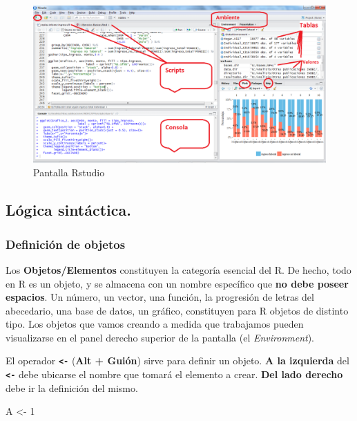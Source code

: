 \documentclass[]{book}
\newenvironment{Shaded}{\begin{snugshade}}{\end{snugshade}}
\newcommand{\DecValTok}[1]{\textcolor[rgb]{0.00,0.00,0.81}{#1}}
\newcommand{\NormalTok}[1]{#1}
\newcommand{\StringTok}[1]{\textcolor[rgb]{0.31,0.60,0.02}{#1}}
\begin{document}
\begin{figure}
\centering
\includegraphics[width=7.8125in,height=\textheight]{img/Pantalla Rstudio.png}
\caption{Pantalla Rstudio}
\end{figure}

\hypertarget{logica-sintactica.}{%
\subsection{Lógica sintáctica.}\label{logica-sintactica.}}

\hypertarget{definicion-de-objetos}{%
\subsubsection{Definición de objetos}\label{definicion-de-objetos}}

Los \textbf{Objetos/Elementos} constituyen la categoría esencial del R. De hecho, todo en R es un objeto, y se almacena con un nombre específico que \textbf{no debe poseer espacios}. Un número, un vector, una función, la progresión de letras del abecedario, una base de datos, un gráfico, constituyen para R objetos de distinto tipo. Los objetos que vamos creando a medida que trabajamos pueden visualizarse en el panel derecho superior de la pantalla (el \emph{Environment}).

El operador \textbf{\texttt{\textless{}-}} (\textbf{Alt + Guión}) sirve para definir un objeto. \textbf{A la izquierda} del \textbf{\texttt{\textless{}-}} debe ubicarse el nombre que tomará el elemento a crear. \textbf{Del lado derecho} debe ir la definición del mismo.

\begin{Shaded}
\begin{Highlighting}[]
\NormalTok{A <-}\StringTok{ }\DecValTok{1}
\end{Highlighting}
\end{Shaded}
\end{document}
